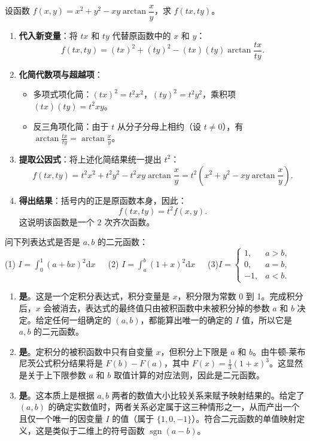\documentclass[lang=cn,11pt]{elegantbook}
\begin{document}
\begin{exercise}[齐次函数性质]
设函数 $f(x,y) = x^2 + y^2 - xy\arctan\dfrac{x}{y}$，求 $f(tx,ty)$。
\end{exercise}
\begin{solution}
\begin{enumerate}
  \item \textbf{代入新变量}：将 $tx$ 和 $ty$ 代替原函数中的 $x$ 和 $y$：
  \[
  f(tx,ty) = (tx)^2 + (ty)^2 - (tx)(ty)\arctan\frac{tx}{ty}.
  \]
  \item \textbf{化简代数项与超越项}：
  \begin{itemize}
    \item 多项式项化简：$(tx)^2 = t^2 x^2$，$(ty)^2 = t^2 y^2$，乘积项 $(tx)(ty) = t^2 xy$。
    \item 反三角项化简：由于 $t$ 从分子分母上相约（设 $t \neq 0$），有 $\arctan\frac{tx}{ty} = \arctan\frac{x}{y}$。
  \end{itemize}
  \item \textbf{提取公因式}：将上述化简结果统一提出 $t^2$：
  \[
  f(tx,ty) = t^2 x^2 + t^2 y^2 - t^2 xy \arctan\frac{x}{y} = t^2 \left( x^2 + y^2 - xy\arctan\frac{x}{y} \right).
  \]
  \item \textbf{得出结果}：括号内的正是原函数本身，因此：
  \[
  f(tx,ty) = t^2 f(x,y).
  \]
  这说明该函数是一个 $2$ 次齐次函数。
\end{enumerate}
\end{solution}

\begin{exercise}[二元函数的辨析]
问下列表达式是否是 $a,b$ 的二元函数：\\
(1) $I = \int_0^1 (a+bx)^2 \mathrm{d}x$~~~(2) $I = \int_a^b (1+x)^2 \mathrm{d}x$~~~(3)$I = \begin{cases} 1, & a>b, \\ 0, & a=b, \\ -1, & a<b. \end{cases}$
\end{exercise}
\begin{solution}
\begin{enumerate}
  \item[(1)] \textbf{是}。这是一个定积分表达式，积分变量是 $x$，积分限为常数 0 到 1。完成积分后，$x$ 会被消去，表达式的最终值只由被积函数中未被积分掉的参数 $a$ 和 $b$ 决定。给定任何一组确定的 $(a,b)$，都能算出唯一的确定的 $I$ 值，所以它是 $a,b$ 的二元函数。
  \item[(2)] \textbf{是}。定积分的被积函数中只有自变量 $x$，但积分上下限是 $a$ 和 $b$。由牛顿-莱布尼茨公式积分结果将是 $F(b) - F(a)$，其中 $F(x) = \frac{1}{3}(1+x)^3$。这显然是关于上下限参数 $a$ 和 $b$ 取值计算的对应法则，因此是二元函数。
  \item[(3)] \textbf{是}。这本质上是根据 $a,b$ 两者的数值大小比较关系来赋予映射结果的。给定了 $(a,b)$ 的确定实数值时，两者关系必定属于这三种情形之一，从而产出一个且仅一个唯一的因变量 $I$ 的值（属于 $\{1, 0, -1\}$）。符合二元函数的单值映射定义，这是类似于二维上的符号函数 $\operatorname{sgn}(a-b)$。
\end{enumerate}
\end{solution}
\end{document}
